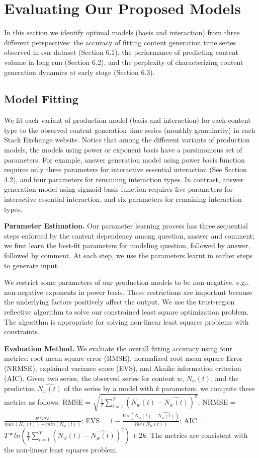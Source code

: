 \section{Evaluating Our Proposed Models}
In this section we identify optimal models (basis and interaction) from three different perspectives: the accuracy of fitting content generation time series observed in our dataset (Section 6.1), the performance of predicting content volume in long run (Section 6.2), and the perplexity of characterizing content generation dynamics at early stage (Section 6.3).

\subsection{Model Fitting}
We fit each variant of production model (basis and interaction) for each content type to the observed content generation time series (monthly granularity) in each Stack Exchange website. Notice that among the different variants of production models, the models using power or exponent basis have a parsimonious set of parameters. For example, answer generation model using power basis function requires only three parameters for interactive essential interaction (See Section 4.2), and four parameters for remaining interaction types. In contrast, answer generation model using sigmoid basis function requires five parameters for interactive essential interaction, and six parameters for remaining interaction types. 

\textbf{Parameter Estimation.} Our parameter learning process has three sequential steps enforced by the content dependency among question, answer and comment; we first learn the best-fit parameters for modeling question, followed by answer, followed by comment. At each step, we use the parameters learnt in earlier steps to generate input.

We restrict some parameters of our production models to be non-negative, e.g., non-negative exponents in power basis. These restrictions are important because the underlying factors positively affect the output. We use the trust-region reflective algorithm to solve our constrained least square optimization problem. The algorithm is appropriate for solving non-linear least squares problems with constraints.

\textbf{Evaluation Method.} We evaluate the overall fitting accuracy using four metrics: root mean square error (RMSE), normalized root mean square Error (NRMSE), explained variance score (EVS), and Akaike information criterion (AIC). Given two series, the observed series for content $w$, $N_w(t)$, and the prediction $\hat{N_w(t)}$ of the series by a model with $k$ parameters, we compute these metrics as follows: RMSE = $\sqrt{\frac{1}{T}\sum_{t=1}^{T}(N_w(t)-\hat{N_w(t)})^2}$; NRMSE = $\frac{RMSE}{max(N_w(t))-min(N_w(t))}$; EVS = $1-\frac{Var(N_w(t)-\hat{N_w(t)})}{Var(N_w(t))}$; AIC = $T*ln(\frac{1}{T}\sum_{t=1}^{T}(N_w(t)-\hat{N_w(t)})^2)+2k$. The metrics are consistent with the non-linear least squares problem.

